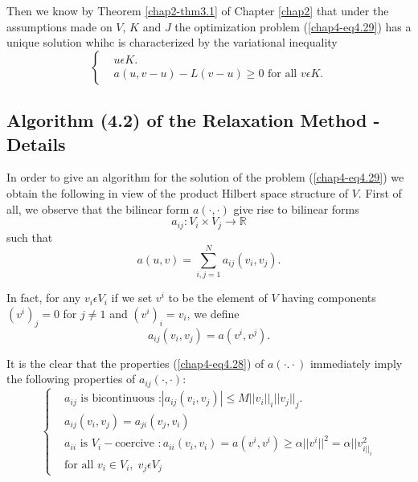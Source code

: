 Then we know by Theorem \ref{chap2-thm3.1} of Chapter \ref{chap2} that under the assumptions made on $V$, $K$ and $J$ the optimization problem (\ref{chap4-eq4.29}) has a unique solution whihc is characterized by the variational inequality
\begin{equation*}
\begin{cases}
& u \epsilon K.\\
& a(u, v - u) - L(v-u) \geq 0 \text{ for all } v \epsilon K.\tag{4.30}\label{chap4-eq4.30}
\end{cases}
\end{equation*}\pageoriginale

\subsection{Algorithm (4.2) of the Relaxation Method - Details}\label{chap4-subsec4.6}
In order to give an algorithm for the solution of the problem (\ref{chap4-eq4.29}) we obtain the following in view of the product Hilbert space structure of $V$. First of all, we observe that the bilinear form $a(\cdot , \cdot)$ give rise to bilinear forms
\begin{equation*}
a_{ij} : V_{i} \times V_{j} \to \mathbb{R}\tag{4.31}\label{chap4-eq4.31}
\end{equation*}
such that
\begin{equation*}
a(u, v) = \sum_{i, j = 1}^{N} a_{ij} (v_{i}, v_{j}).
\end{equation*}

In fact, for any $v_{i} \epsilon V_{i}$ if we set $v^{i}$ to be the element of $V$ having components $(v^{i})_{j} = 0$ for $j \neq 1$ and $(v^{i})_{i} = v_{i}$, we define
\begin{equation*}
a_{ij}(v_{i}, v_{j}) = a(v^{i}, v^{j}).\tag{4.33}\label{chap4-eq4.33}
\end{equation*}

It is the clear that the properties (\ref{chap4-eq4.28}) of $a(\cdot . \cdot)$ immediately imply the following properties of $a_{ij} (\cdot , \cdot)$:
\begin{equation*}
\begin{cases}
& a_{ij} \text{ is bicontinuous :} |a_{ij}(v_{i}, v_{j})| \leq M ||v_{i}||_{i} ||v_{j}||_{j}.\\
& a_{ij} (v_{i}, v_{j}) = a_{ji} (v_{j}, v_{i})\\
& a_{ii} \text{ is } V_{i}-\text{coercive }: a_{ii} (v_{i}, v_{i}) = a(v^{i}, v^{i}) \geq \alpha ||v^{i}||^{2} = \alpha ||v_{i||_{i}}^{2}\\
& \text{for all } v_i \in V_{i}, \; v_{j} \epsilon V_{j}
\end{cases} \tag{4.34}\label{chap4-eq4.34}
\end{equation*}

